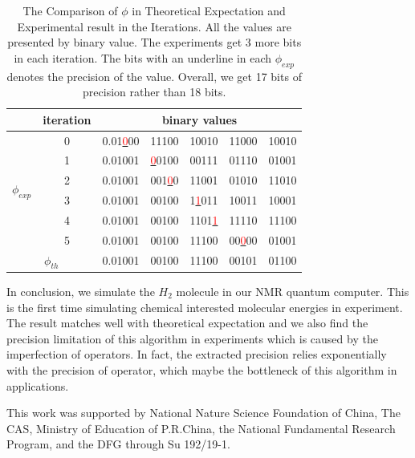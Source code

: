 \def\CTeXPreproc{Created by ctex v0.2.12, don't edit!}\documentclass[twocolumn,showpacs,twoside,10pt,superscriptaddress,prl]{revtex4}
\begin{document}
\begin{table}[htb]
\begin{center} {\footnotesize
\begin{tabular}{|c|c|ccccc|}
\hline
 & iteration & \multicolumn{5}{c}{binary values}\\
\hline
 \multirow{6}{*}{$\phi_{exp}$}
 & 0 & 0.01\underline{\textcolor{Red}{0}}00 & 11100 & 10010 & 11000 & 10010 \\
 &  1 & 0.01001 & \underline{\textcolor{Red}{0}}0100 & 00111 & 01110 & 01001\\
 &  2 & 0.01001 & 001\underline{\textcolor{Red}{0}}0 & 11001 & 01010 & 11010\\
 &  3 & 0.01001 & 00100 & 1\underline{\textcolor{Red}{1}}011 & 10011 & 10001\\
 &  4 & 0.01001 & 00100 & 1101\underline{\textcolor{Red}{1}} & 11110 & 11100\\
 &  5 & 0.01001 & 00100 & 11100 & 00\underline{\textcolor{Red}{0}}00 & 01001\\
\hline
\multicolumn{2}{|c|}{$\phi_{th}$} & 0.01001 & 00100 & 11100 & 00101 & 01100  \\
\hline
\end{tabular} }
\end{center}
\caption{\footnotesize The Comparison of $\phi$ in Theoretical
Expectation and Experimental result in the Iterations. All the
values are presented by binary value. The experiments get 3 more
bits in each iteration. The bits with an underline in each
$\phi_{exp}$ denotes the precision of the value. Overall, we get 17
bits of precision rather than 18 bits.} \label{comparision}
\end{table}

In conclusion, we simulate the $H_2$ molecule in our NMR quantum
computer. This is the first time simulating chemical interested
molecular energies in experiment. The result matches well with
theoretical expectation and we also find the precision limitation of
this algorithm in experiments which is caused by the imperfection of
operators. In fact, the extracted precision relies exponentially
with the precision of operator, which maybe the bottleneck of this
algorithm in applications.


This work was supported by National Nature Science Foundation of
China, The CAS, Ministry of Education of P.R.China, the National
Fundamental Research Program, and the DFG through Su 192/19-1.


\end{document}
